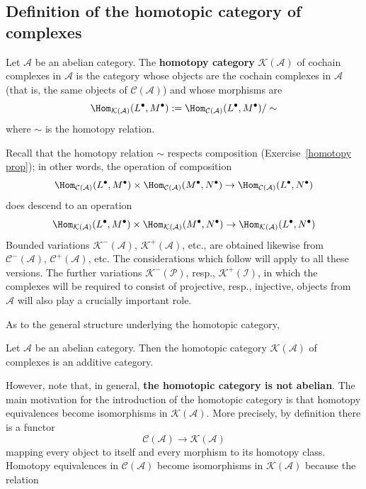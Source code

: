 \subsection{Definition of the homotopic category of complexes}
\begin{definition}
Let $\mathcal{A}$ be an abelian category. The \textbf{homotopy category} $\mathcal{K}(\mathcal{A})$ of cochain complexes in $\mathcal{A}$ is the category whose objects are the cochain complexes in $\mathcal{A}$ (that is, the same objects of $\mathcal{C}(\mathcal{A})$) and whose morphisms are
\[\Hom_{\mathcal{K}(\mathcal{A})}(L^\bullet,M^\bullet):=\Hom_{\mathcal{C}(\mathcal{A})}(L^\bullet,M^\bullet)/\sim\]
where $\sim$ is the homotopy relation.
\end{definition}
Recall that the homotopy relation $\sim$ respects composition (Exercise~\ref{homotopy prop}); in other words, the operation of composition
\[\Hom_{\mathcal{C}(\mathcal{A})}(L^\bullet,M^\bullet)\times\Hom_{\mathcal{C}(\mathcal{A})}(M^\bullet,N^\bullet)\to\Hom_{\mathcal{C}(\mathcal{A})}(L^\bullet,N^\bullet)\]
does descend to an operation
\[\Hom_{\mathcal{K}(\mathcal{A})}(L^\bullet,M^\bullet)\times\Hom_{\mathcal{K}(\mathcal{A})}(M^\bullet,N^\bullet)\to\Hom_{\mathcal{K}(\mathcal{A})}(L^\bullet,N^\bullet)\]
Bounded variations $\mathcal{K}^-(\mathcal{A})$, $\mathcal{K}^+(\mathcal{A})$, etc., are obtained likewise from $\mathcal{C}^-(\mathcal{A})$, $\mathcal{C}^+(\mathcal{A})$, etc. The considerations which follow will apply to all these versions. The further variations $\mathcal{K}^-(\mathcal{P})$, resp., $\mathcal{K}^+(\mathcal{I})$, in which the complexes will be required to consist of projective, resp., injective, objects from $\mathcal{A}$ will also play a crucially important role.\par
As to the general structure underlying the homotopic category,
\begin{lemma}
Let $\mathcal{A}$ be an abelian category. Then the homotopic category $\mathcal{K}(\mathcal{A})$ of
complexes is an additive category.
\end{lemma}
However, note that, in general, \textbf{the homotopic category is not abelian}.
The main motivation for the introduction of the homotopic category is that homotopy equivalences become isomorphisms in $\mathcal{K}(\mathcal{A})$. More precisely, by definition there is a functor
\[\mathcal{C}(\mathcal{A})\to\mathcal{K}(\mathcal{A})\]
mapping every object to itself and every morphism to its homotopy class. Homotopy equivalences in $\mathcal{C}(\mathcal{A})$ become isomorphisms in $\mathcal{K}(\mathcal{A})$ because the relation

